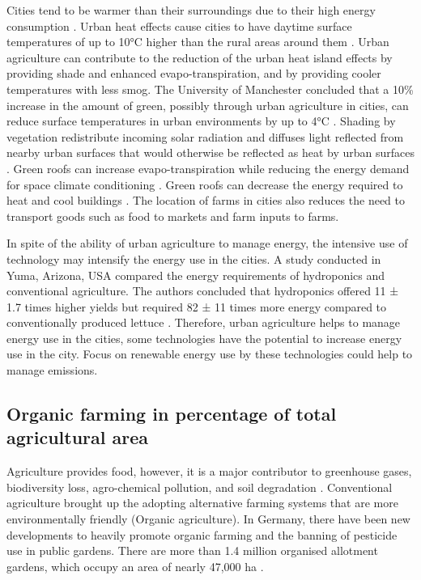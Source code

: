 Cities tend to be warmer than their surroundings due to their high energy consumption \cite{Heather2012}. Urban heat effects cause cities to have daytime surface temperatures of up to 10°C higher than the rural areas around them \cite{Voiland2010}. Urban agriculture can contribute to the reduction of the urban heat island effects by providing shade and enhanced evapo-transpiration, and by providing cooler temperatures with less smog. The University of Manchester concluded that a 10\% increase in the amount of green, possibly through urban agriculture in cities, can reduce surface temperatures in urban environments by up to 4°C \cite{Gill2007}. Shading by vegetation redistribute incoming solar radiation and diffuses light reflected from nearby urban surfaces that would otherwise be reflected as heat by urban surfaces \cite{RIZWAN2008}. Green roofs can increase evapo-transpiration while reducing the energy demand for space climate conditioning \cite{QIU2013}. Green roofs can decrease the energy required to heat and cool buildings \cite{Ackerman2014}. The location of farms in cities also reduces the need to transport goods such as food to markets and farm inputs to farms.

In spite of the ability of urban agriculture to manage energy, the intensive use of technology may intensify the energy use in the cities. A study conducted in Yuma, Arizona, USA compared the energy requirements of hydroponics and conventional agriculture. The authors concluded that hydroponics offered 11 ± 1.7 times higher yields but required 82 ± 11 times more energy compared to conventionally produced lettuce \cite{Barbosa2015}. Therefore, urban agriculture helps to manage energy use in the cities, some technologies have the potential to increase energy use in the city. Focus on renewable energy use by these technologies could help to manage emissions.

\subsection{Organic farming in percentage of total agricultural area}

Agriculture provides food, however, it is a major contributor to greenhouse gases, biodiversity loss, agro-chemical pollution, and soil degradation \cite{Crowder2015}. Conventional agriculture brought up the adopting alternative farming systems that are more environmentally friendly (Organic agriculture). In Germany, there have been new developments to heavily promote organic farming and the banning of pesticide use in public gardens. There are more than 1.4 million organised allotment gardens, which occupy an area of nearly 47,000 ha \cite{Hoornweg2012}.

